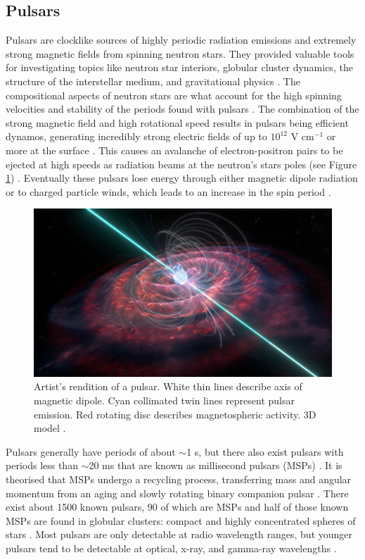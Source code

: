 \documentclass[12pt]{article}
\begin{document}
\subsection{Pulsars}

Pulsars are clocklike sources of highly periodic radiation emissions and extremely strong magnetic fields from spinning neutron stars. They provided valuable tools for investigating topics like neutron star interiors, globular cluster dynamics, the structure of the interstellar medium, and gravitational physics \cite{pulsars}.
The compositional aspects of neutron stars are what account for the high spinning velocities and stability of the periods found with pulsars \cite{pulsars}. The combination of the strong magnetic field and high rotational speed results in pulsars being efficient dynamos, generating incredibly strong electric fields of up to $10^{12}$ V cm$^{-1}$ or more at the surface \cite{pulsars}.
This causes an avalanche of electron-positron pairs to be ejected at high speeds as radiation beams at the neutron's stars poles (see Figure \ref{fig:3}) \cite{pulsars,pulsars2,pulsars3}. Eventually these pulsars lose energy through either magnetic dipole radiation or to charged particle winds, which leads to an increase in the spin period \cite{pulsars}.

\begin{figure}[!b]
    \centering
    \includegraphics[width=.8\textwidth]{artist rendition pulsar.jpeg}
    \caption{Artist's rendition of a pulsar. White thin lines describe axis of magnetic dipole. Cyan collimated twin lines represent pulsar emission. Red rotating disc describes magnetospheric activity. 3D model \protect\cite{artistpulsar}.}
    \label{fig:3}
\end{figure}

Pulsars generally have periods of about $\sim$1 s, but there also exist pulsars with periods less than $\sim$20 ms that are known as millisecond pulsars (MSPs) \cite{pulsars}.
It is theorised that MSPs undergo a recycling process, transferring mass and angular momentum from an aging and slowly rotating binary companion pulsar \cite{pulsars,pulsars3}. There exist about 1500 known pulsars, 90 of which are MSPs and half of those known MSPs are found in globular clusters:
compact and highly concentrated spheres of stars \cite{pulsars}. Most pulsars are only detectable at radio wavelength ranges, but younger pulsars tend to be detectable at optical, x-ray, and gamma-ray wavelengths \cite{pulsars}.
\end{document}
